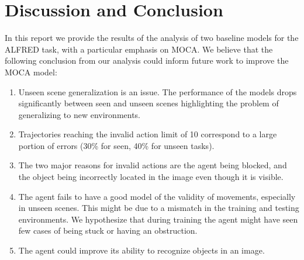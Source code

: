 \documentclass[11pt,a4paper]{article}
\begin{document}
\section{Discussion and Conclusion}
In this report we provide the results of the analysis of two baseline models for the ALFRED task, with a particular emphasis on MOCA. We believe that the following conclusion from our analysis could inform future work to improve the MOCA model:
\begin{enumerate}
    \item Unseen scene generalization is an issue. The performance of the models drops significantly between seen and unseen scenes highlighting the problem of generalizing to new environments.
    \item Trajectories reaching the invalid action limit of 10 correspond to a large portion of errors (30\% for seen, 40\% for unseen tasks). 
    \item The two major reasons for invalid actions are the agent being blocked, and the object being incorrectly located in the image even though it is visible.
    \item The agent fails to have a good model of the validity of movements, especially in unseen scenes. This might be due to a mismatch in the training and testing environments. We hypothesize that during training the agent might have seen few cases of being stuck or having an obstruction.
    \item The agent could improve its ability to recognize objects in an image. 
\end{enumerate}




\clearpage



\end{document}
